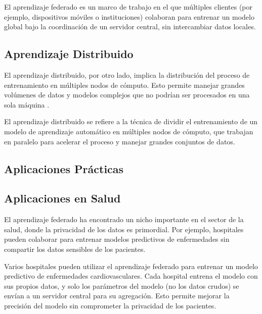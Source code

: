 \begin{definition}
	El aprendizaje federado es un marco de trabajo en el que múltiples clientes (por ejemplo, dispositivos móviles o instituciones) colaboran para entrenar un modelo global bajo la coordinación de un servidor central, sin intercambiar datos locales.
\end{definition}

\subsection{Aprendizaje Distribuido}
El aprendizaje distribuido, por otro lado, implica la distribución del proceso de entrenamiento en múltiples nodos de cómputo. Esto permite manejar grandes volúmenes de datos y modelos complejos que no podrían ser procesados en una sola máquina \cite{dean2012large}.

\begin{definition}
	El aprendizaje distribuido se refiere a la técnica de dividir el entrenamiento de un modelo de aprendizaje automático en múltiples nodos de cómputo, que trabajan en paralelo para acelerar el proceso y manejar grandes conjuntos de datos.
\end{definition}

\subsection{Aplicaciones Prácticas}

\subsection{Aplicaciones en Salud}
El aprendizaje federado ha encontrado un nicho importante en el sector de la salud, donde la privacidad de los datos es primordial. Por ejemplo, hospitales pueden colaborar para entrenar modelos predictivos de enfermedades sin compartir los datos sensibles de los pacientes.

\begin{example}
	Varios hospitales pueden utilizar el aprendizaje federado para entrenar un modelo predictivo de enfermedades cardiovasculares. Cada hospital entrena el modelo con sus propios datos, y solo los parámetros del modelo (no los datos crudos) se envían a un servidor central para su agregación. Esto permite mejorar la precisión del modelo sin comprometer la privacidad de los pacientes.
\end{example}

